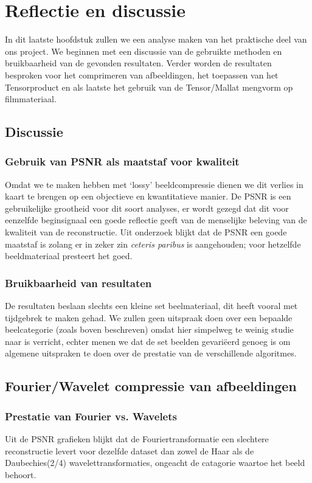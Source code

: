 \chapter{Reflectie en discussie}
\label{discH}
In dit laatste hoofdstuk zullen we een analyse maken van het praktische deel van ons project.
We beginnen met een discussie van de gebruikte methoden en bruikbaarheid van de gevonden resultaten.
Verder worden de resultaten besproken voor het comprimeren van afbeeldingen, het toepassen van het 
Tensorproduct en als laatste het gebruik van de Tensor/Mallat mengvorm op filmmateriaal. 

\section{Discussie}
\subsection{Gebruik van PSNR als maatstaf voor kwaliteit}
Omdat we te maken hebben met `lossy' beeldcompressie dienen we dit verlies in kaart te brengen op een 
objectieve en kwantitatieve manier. 
De PSNR is een gebruikelijke grootheid voor dit soort analyses, er wordt gezegd dat dit voor eenzelfde 
beginsignaal een goede reflectie geeft van de menselijke beleving van de kwaliteit van de reconstructie.
Uit onderzoek\cite{PSNR} blijkt dat de PSNR een goede maatstaf is zolang er in zeker zin \emph{ceteris paribus}
is aangehouden; voor hetzelfde beeldmateriaal presteert het goed.

\subsection{Bruikbaarheid van resultaten}

De resultaten beslaan slechts een kleine set beelmateriaal, dit heeft vooral met tijdgebrek te maken gehad.
We zullen geen uitspraak doen over een bepaalde beelcategorie (zoals boven beschreven) omdat hier simpelweg te
weinig studie naar is verricht, echter menen we dat de set beelden gevari\"eerd genoeg is om algemene uitspraken te doen
over de prestatie van de verschillende algoritmes.

\section{Fourier/Wavelet compressie van afbeeldingen}

\subsection{Prestatie van Fourier vs. Wavelets}
Uit de PSNR grafieken blijkt dat de Fouriertransformatie een slechtere reconstructie levert voor dezelfde dataset
dan zowel de Haar als de Daubechies(2/4) wavelettransformaties, ongeacht de catagorie waartoe het beeld behoort.

